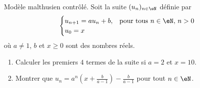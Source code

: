 
\begin{exercice}\label{exoECdecembre2010-0001}

	Modèle malthusien contrôlé. Soit la suite $(u_n)_{n\in\eN}$ définie par
	\begin{equation}\nonumber
		\begin{cases}
			u_{n+1}=au_n+b,	&	\textrm{pour tous } n\in\eN, \, n>0\\
			u_0=x
		\end{cases}
	\end{equation}
	où $a\neq 1$, $b$ et $x\geq 0$ sont des nombres réels.
	\begin{enumerate}
        \item Calculer les premiers $4$ termes de la suite si $a=2$ et $x=10$.
		\item
			Montrer que $u_n=a^n(x+\frac{ b }{ a-1 })-\frac{ b }{ a-1 }$ pour tout $n\in\eN$.
	\end{enumerate}


\end{exercice}
